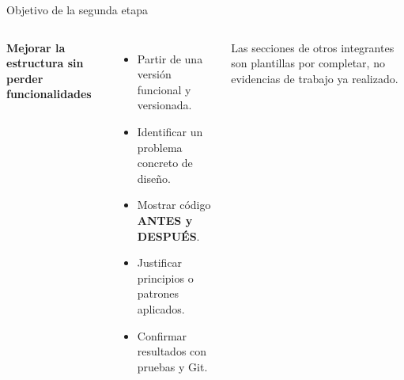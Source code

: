 \begin{frame}{Objetivo de la segunda etapa}
\begin{columns}[T,onlytextwidth]
  \vspace{0.12cm}
  {\Large\bfseries Mejorar la estructura sin perder funcionalidades}\par\vspace{0.34cm}
  \begin{itemize}\setlength\itemsep{0.27cm}
    \item Partir de una versión funcional y versionada.
    \item Identificar un problema concreto de diseño.
    \item Mostrar código \textbf{ANTES y DESPUÉS}.
    \item Justificar principios o patrones aplicados.
    \item Confirmar resultados con pruebas y Git.
  \end{itemize}
  \vspace{0.28cm}
  {\footnotesize\color{AzulMedio} Las secciones de otros integrantes son plantillas por completar, no evidencias de trabajo ya realizado.}
\end{columns}
\end{frame}
